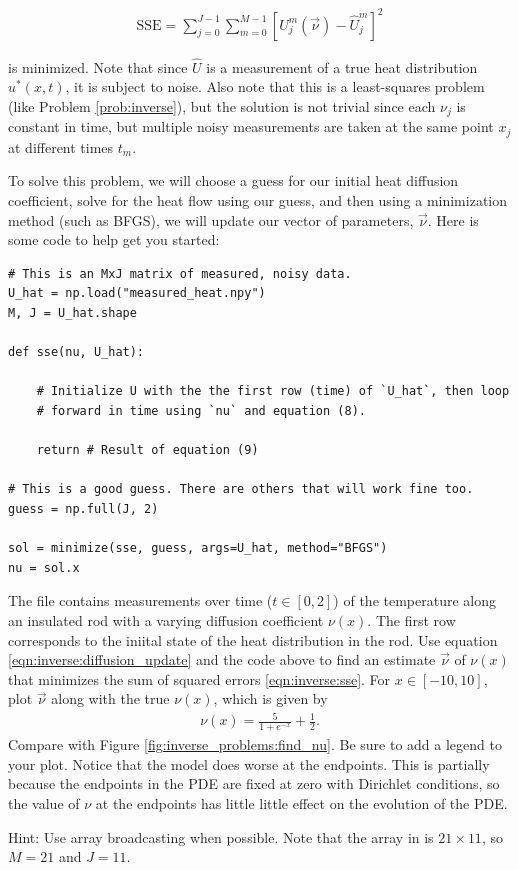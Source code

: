 \begin{align}
\text{SSE} = \sum_{j=0}^{J-1} \sum_{m=0}^{M-1} [U_j^m(\vec \nu) - \hat U_j^m]^2
\label{eqn:inverse:sse}
\end{align}

\noindent is minimized.
Note that since $\hat U$ is a measurement of a true heat distribution $u^*(x,t)$, it is subject to noise.
Also note that this is a least-squares problem (like Problem \ref{prob:inverse}), but the solution is not trivial since each $\nu_j$ is constant in time, but multiple noisy measurements are taken at the same point $x_j$ at different times $t_m$.

To solve this problem, we will choose a guess for our initial heat diffusion coefficient, solve for the heat flow using our guess, and then using a minimization method (such as BFGS), we will update our vector of parameters, $\vec \nu$. Here is some code to help get you started:

\begin{lstlisting}
# This is an MxJ matrix of measured, noisy data.
U_hat = np.load("measured_heat.npy")
M, J = U_hat.shape

def sse(nu, U_hat):

    # Initialize U with the the first row (time) of `U_hat`, then loop
    # forward in time using `nu` and equation (8).

    return # Result of equation (9)

# This is a good guess. There are others that will work fine too.
guess = np.full(J, 2)

sol = minimize(sse, guess, args=U_hat, method="BFGS")
nu = sol.x
\end{lstlisting}

\begin{problem}
The file  contains measurements over time ($t \in [0, 2]$) of the temperature along an insulated rod with a varying diffusion coefficient $\nu(x)$.
The first row corresponds to the iniital state of the heat distribution in the rod.
Use equation \eqref{eqn:inverse:diffusion_update} and the code above to find an estimate $\vec \nu$ of $\nu(x)$ that minimizes the sum of squared errors \eqref{eqn:inverse:sse}.
For $x \in [-10, 10]$, plot $\vec \nu$ along with the true $\nu(x)$, which is given by
\begin{align*}
\nu(x) = \frac{5}{1+e^{-x}}+\frac{1}{2}.
\end{align*}
Compare with Figure \ref{fig:inverse_problems:find_nu}.
Be sure to add a legend to your plot.
Notice that the model does worse at the endpoints.
This is partially because the endpoints in the PDE are fixed at zero with Dirichlet conditions, so the value of $\nu$ at the endpoints has little little effect on the evolution of the PDE.

Hint: Use array broadcasting when possible. Note that the array in  is $21 \times 11$, so $M = 21$ and $J = 11$.
\label{inverse_problems:varying_nu}
\end{problem}

